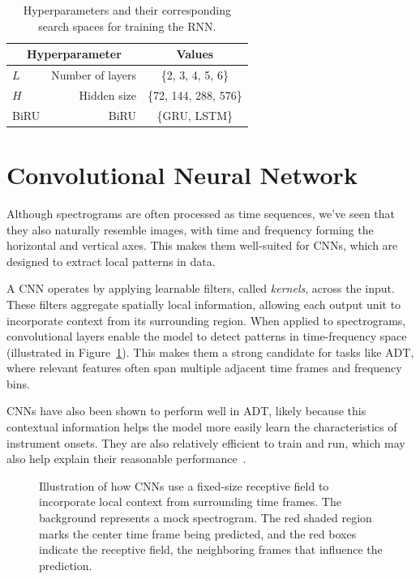 \begin{table}[H]
    \centering
    \begin{tabular}{lr|c}
        \multicolumn{2}{c|}{Hyperparameter} & Values       \\
        \hline
        $L$ & Number of layers      & \{2, 3, 4, 5, 6\} \\
        $H$ & Hidden size      & \{72, 144, 288, 576\} \\
        \gls{BiRU} & \acrlong{BiRU} & \{\gls{GRU}, \gls{LSTM}\}\\
    \end{tabular}
    \caption{Hyperparameters and their corresponding search spaces for training the \acrlong{RNN}.}
    \label{RNNHyperparams}
\end{table}

\section{Convolutional Neural Network}

Although spectrograms are often processed as time sequences, we've seen that they also naturally resemble images, with time and frequency forming the horizontal and vertical axes. This makes them well-suited for \glspl{CNN}, which are designed to extract local patterns in data.

A \gls{CNN} operates by applying learnable filters, called \textit{kernels}, across the input. These filters aggregate spatially local information, allowing each output unit to incorporate context from its surrounding region. When applied to spectrograms, convolutional layers enable the model to detect patterns in time-frequency space (illustrated in Figure~\ref{CNNInfluenceFigure}). This makes them a strong candidate for tasks like \gls{ADT}, where relevant features often span multiple adjacent time frames and frequency bins.

\glspl{CNN} have also been shown to perform well in \gls{ADT}, likely because this contextual information helps the model more easily learn the characteristics of instrument onsets. They are also relatively efficient to train and run, which may also help explain their reasonable performance~\cite{Vogl2017DrumTV}.

\begin{figure}[H]
    \centering
    
    \caption{Illustration of how \glspl{CNN} use a fixed-size receptive field to incorporate local context from surrounding time frames. The background represents a mock spectrogram. The red shaded region marks the center time frame being predicted, and the red boxes indicate the receptive field, the neighboring frames that influence the prediction.}
    \label{CNNInfluenceFigure}
\end{figure}

